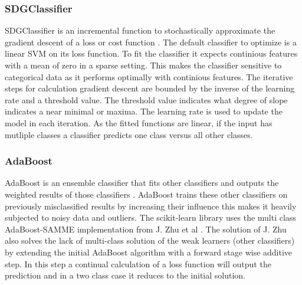 \documentclass[a4paper,10pt]{article}
\begin{document}
\subsubsection{SDGClassifier}
SDGClassifier is an incremental function to stochastically approximate the gradient descent of a loss or cost function \cite{SGDClass}. The default classifier to optimize is a linear SVM on its loss function. To fit the classifier it expects continious features with a mean of zero in a sparse setting. This makes the classifier sensitive to categorical data as it performs optimally with continious features. The iterative steps for calculation gradient descent are bounded by the inverse of the learning rate and a threshold value. The threshold value indicates what degree of slope indicates a near minimal or maxima. The learning rate is used to update the model in each iteration. As the fitted functions are linear, if the input has mutliple classes a classifier predicts one class versus all other classes. 

\subsubsection{AdaBoost}
AdaBoost is an ensemble classifier that fits other classifiers and outputs the weighted results of those classifiers \cite{AdaBoost}. AdaBoost trains these other classifiers on previously misclassified results by increasing their influence this makes it heavily subjected to noisy data and outliers. The scikit-learn library uses the multi class AdaBoost-SAMME implementation from J. Zhu et al \cite{MadaB}. The solution of J. Zhu also solves the lack of multi-class solution of the weak learners (other classifiers) by extending the initial AdaBoost algorithm with a forward stage wise additive step. In this step a continual calculation of a loss function will output the prediction and in a two class case it reduces to the initial solution.
\end{document}
